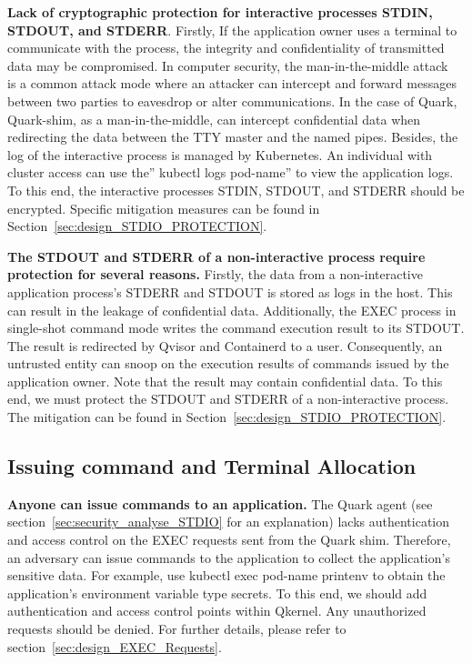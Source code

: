 \textbf{Lack of cryptographic protection for interactive processes STDIN, STDOUT, and STDERR}. Firstly, If the application owner uses a terminal to communicate with the process, the integrity and confidentiality of transmitted data may be compromised. In computer security, the man-in-the-middle 
attack~\cite*{Man_in_the_middle_attack} is a common attack mode where an attacker can intercept and forward messages between two parties to eavesdrop or alter communications. In the case of Quark,  Quark-shim, as a man-in-the-middle, can intercept confidential data when redirecting the data between the TTY master and the named 
pipes. Besides, the log of the interactive process is managed by Kubernetes. An individual with cluster access can use the” kubectl logs pod-name” to view the application logs. To this end, the interactive processes STDIN, STDOUT, and STDERR should be encrypted. Specific mitigation measures can be 
found in  Section~\ref{sec:design_STDIO_PROTECTION}.
 
 
\textbf{The STDOUT and STDERR of a non-interactive process require protection for several reasons.} Firstly, the data from a non-interactive application process’s STDERR and STDOUT is stored as logs in the host. This can result in the leakage of confidential data. Additionally, the EXEC process in 
single-shot command mode writes the command execution result to its STDOUT. The result is redirected by Qvisor and Containerd to a user. Consequently, an untrusted entity can snoop on the execution results of commands issued by the application owner. Note that the result may contain confidential data. 
To this end, we must protect the STDOUT and STDERR of a non-interactive process. The mitigation can be found in  Section~\ref{sec:design_STDIO_PROTECTION}.


\subsection{Issuing command and Terminal Allocation}
\textbf{Anyone can issue commands to an application.} The Quark agent (see section~\ref{sec:security_analyse_STDIO} for an explanation) lacks authentication and access control on the EXEC requests sent from the Quark shim. Therefore, an adversary can issue commands to the application to collect the 
application’s sensitive data. For example, use kubectl exec pod-name printenv to obtain the application’s environment variable type secrets. To this end, we should add authentication and access control points within Qkernel. Any unauthorized requests should be denied. For further details, please 
refer to section~\ref{sec:design_EXEC_Requests}.

